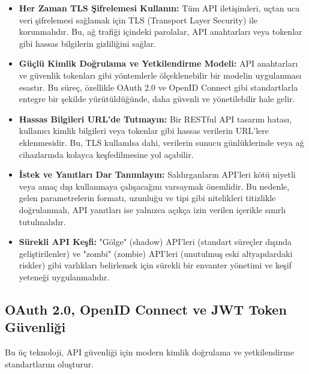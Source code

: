 \begin{itemize}
\item \textbf{Her Zaman TLS Şifrelemesi Kullanın:} Tüm API iletişimleri, uçtan uca veri şifrelemesi sağlamak için TLS (Transport Layer Security) ile korunmalıdır. Bu, ağ trafiği içindeki parolalar, API anahtarları veya tokenlar gibi hassas bilgilerin gizliliğini sağlar.
\item \textbf{Güçlü Kimlik Doğrulama ve Yetkilendirme Modeli:} API anahtarları ve güvenlik tokenları gibi yöntemlerle ölçeklenebilir bir modelin uygulanması esastır. Bu süreç, özellikle OAuth 2.0 ve OpenID Connect gibi standartlarla entegre bir şekilde yürütüldüğünde, daha güvenli ve yönetilebilir hale gelir.
\item \textbf{Hassas Bilgileri URL'de Tutmayın:} Bir RESTful API tasarım hatası, kullanıcı kimlik bilgileri veya tokenlar gibi hassas verilerin URL'lere eklenmesidir. Bu, TLS kullanılsa dahi, verilerin sunucu günlüklerinde veya ağ cihazlarında kolayca keşfedilmesine yol açabilir.
\item \textbf{İstek ve Yanıtları Dar Tanımlayın:} Saldırganların API'leri kötü niyetli veya amaç dışı kullanmaya çalışacağını varsaymak önemlidir. Bu nedenle, gelen parametrelerin formatı, uzunluğu ve tipi gibi nitelikleri titizlikle doğrulanmalı, API yanıtları ise yalnızca açıkça izin verilen içerikle sınırlı tutulmalıdır.
\item \textbf{Sürekli API Keşfi:} "Gölge" (shadow) API'leri (standart süreçler dışında geliştirilenler) ve "zombi" (zombie) API'leri (unutulmuş eski altyapılardaki riskler) gibi varlıkları belirlemek için sürekli bir envanter yönetimi ve keşif yeteneği uygulanmalıdır.
\end{itemize}

\subsection{OAuth 2.0, OpenID Connect ve JWT Token Güvenliği}

Bu üç teknoloji, API güvenliği için modern kimlik doğrulama ve yetkilendirme standartlarını oluşturur.

